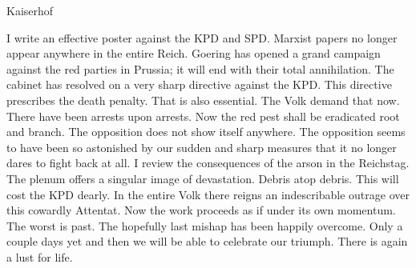 Kaiserhof

I write an effective poster against the KPD and SPD. Marxist papers no longer appear anywhere in the entire Reich. Goering has opened a grand campaign against the red parties in Prussia; it will end with their total annihilation. The cabinet has resolved on a very sharp directive against the KPD. This directive prescribes the death penalty. That is also essential. The Volk demand that now. There have been arrests upon arrests. Now the red pest shall be eradicated root and branch. The opposition does not show itself anywhere. The opposition seems to have been so astonished by our sudden and sharp measures that it no longer dares to fight back at all. I review the consequences of the arson in the Reichstag. The plenum offers a singular image of devastation. Debris atop debris. This will cost the KPD dearly. In the entire Volk there reigns an indescribable outrage over this cowardly Attentat. Now the work proceeds as if  under its own momentum. The worst is past. The hopefully last mishap has been happily overcome. Only a couple days yet and then we will be able to celebrate our triumph. There is again a lust for life.
